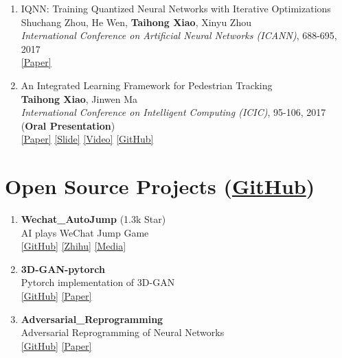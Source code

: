\documentclass[letterpaper]{article}
\begin{document}
\begin{enumerate}
\item IQNN: Training Quantized Neural Networks with Iterative Optimizations\\
	Shuchang Zhou, He Wen, {\bf Taihong Xiao}, Xinyu Zhou\\
	{\it International Conference on Artificial Neural Networks (ICANN)},  688-695, 2017\\
	\href{https://link.springer.com/chapter/10.1007\%2F978-3-319-68612-7_78}{[Paper]} 

\item An Integrated Learning Framework for Pedestrian Tracking\\
	{\bf Taihong Xiao}, Jinwen Ma\\
	{\it International Conference on Intelligent Computing (ICIC)}, 95-106, 2017 ({\bf Oral Presentation})\\
	\href{https://link.springer.com/chapter/10.1007\%2F978-3-319-63315-2_9}{[Paper]}
	\href{https://prinsphield.github.io/extra/ICIC-20170808.pdf}{[Slide]}
	\href{https://youtu.be/HQIi0Z9b4Pw}{[Video]}
	\href{https://github.com/Prinsphield/ILFPT}{[GitHub]}

\end{enumerate}



\section*{Open Source Projects (\href{https://github.com/Prinsphield}{GitHub})}

\begin{enumerate}

\item {\bf Wechat\_AutoJump} (1.3k Star)\\
	AI plays WeChat Jump Game \\
	\href{https://github.com/Prinsphield/Wechat_AutoJump}{[GitHub]}
	\href{https://zhuanlan.zhihu.com/p/32636329}{[Zhihu]}
	\href{https://www.jiqizhixin.com/articles/2018-01-06-9}{[Media]}

\item {\bf 3D-GAN-pytorch}\\
	Pytorch implementation of 3D-GAN \\
	\href{https://github.com/Prinsphield/Wechat_AutoJump}{[GitHub]}
	\href{http://3dgan.csail.mit.edu/papers/3dgan_nips.pdf}{[Paper]}

\item {\bf Adversarial\_Reprogramming}\\
	Adversarial Reprogramming of Neural Networks \\
	\href{https://github.com/Prinsphield/Adversarial_Reprogramming}{[GitHub]}
	\href{https://arxiv.org/abs/1806.11146}{[Paper]}

\end{enumerate}
\end{document}
